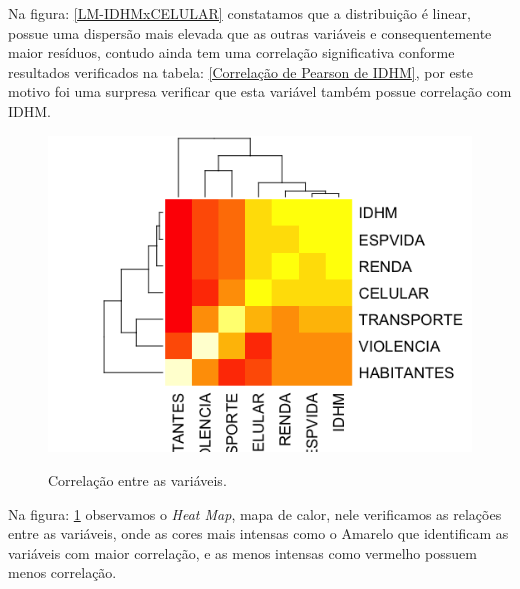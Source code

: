 \documentclass[journal]{IEEEtran}
\begin{document}
Na figura: \ref{LM-IDHMxCELULAR} constatamos que a distribuição é linear, possue uma dispersão mais elevada que as outras variáveis e consequentemente maior resíduos, contudo ainda tem uma correlação significativa conforme resultados verificados na tabela: \ref{Correlação de Pearson de IDHM}, por este motivo foi uma surpresa verificar que esta variável também possue correlação com IDHM.

\begin{figure}[H]
\center
{\includegraphics[scale=0.5]{./figuras/COR-Tabela.png}}
\caption{Correlação entre as variáveis.}
\label{COR-Tabela}
\end{figure}

Na figura: \ref{COR-Tabela} observamos o \emph{Heat Map}, mapa de calor, nele verificamos as relações entre as variáveis, onde as cores mais intensas como o Amarelo que identificam as variáveis com maior correlação, e as menos intensas como vermelho possuem menos correlação.
\end{document}
